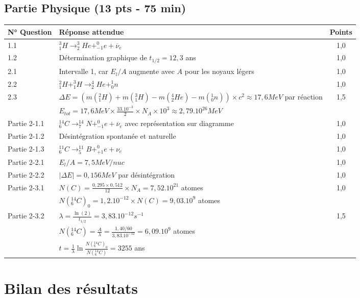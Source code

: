 \documentclass[12pt]{article}
\begin{document}
\subsection{Partie Physique (13 pts - 75 min)}
\centering
\begin{tabular}{|>{\columncolor{lightblue}}l|l|c|}
\hline
\rowcolor{lightblue}
\textbf{N° Question} & \textbf{Réponse attendue} & \textbf{Points} \\
\hline
1.1 & $_1^3H \rightarrow _2^3He + _{-1}^0e + \overline{\nu}_e$ & 1,0 \\
\hline
1.2 & Détermination graphique de $t_{1/2} = 12,3$ ans & 1,0 \\
\hline
2.1 & Intervalle 1, car $E_l/A$ augmente avec $A$ pour les noyaux légers & 1,0 \\
\hline
2.2 & $_1^2H + _1^3H \rightarrow _2^4He + _0^1n$ & 1,0 \\
\hline
2.3 & $\Delta E = (m(_1^2H) + m(_1^3H) - m(_2^4He) - m(_0^1n)) \times c^2 \approx 17,6 MeV$ par réaction & 1,5 \\
& $E_{tot} = 17,6 MeV \times \frac{33.10^{-3}}{2} \times N_A \times 10^3 \approx 2,79.10^{26} MeV$ & \\
\hline
Partie 2-1.1 & $_6^{14}C \rightarrow _7^{14}N + _{-1}^0e + \overline{\nu}_e$ avec représentation sur diagramme & 1,0 \\
\hline
Partie 2-1.2 & Désintégration spontanée et naturelle & 1,0 \\
\hline
Partie 2-1.3 & $_6^{11}C \rightarrow _5^{11}B + _{+1}^0e + \nu_e$ & 1,0 \\
\hline
Partie 2-2.1 & $E_l/A = 7,5 MeV/nuc$ & 1,0 \\
\hline
Partie 2-2.2 & $|\Delta E| = 0,156 MeV$ par désintégration & 1,0 \\
\hline
Partie 2-3.1 & $N(C) = \frac{0,295 \times 0,512}{12} \times N_A = 7,52.10^{21}$ atomes & 1,0 \\
& $N(_6^{14}C)_0 = 1,2.10^{-12} \times N(C) = 9,03.10^{9}$ atomes & \\
\hline
Partie 2-3.2 & $\lambda = \frac{\ln(2)}{t_{1/2}} = 3,83.10^{-12} s^{-1}$ & 1,5 \\
& $N(_6^{14}C) = \frac{A}{\lambda} = \frac{1,40/60}{3,83.10^{-12}} = 6,09.10^{9}$ atomes & \\
& $t = \frac{1}{\lambda}\ln\frac{N(_6^{14}C)_0}{N(_6^{14}C)} = 3255$ ans & \\
\hline
\end{tabular}

\section{Bilan des résultats}
\end{document}
